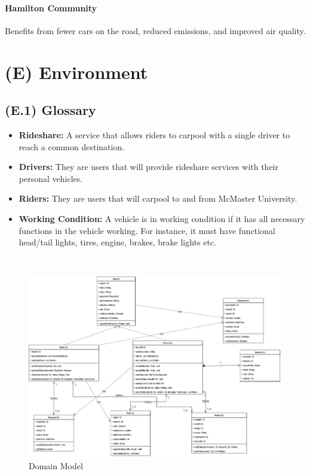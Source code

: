 \documentclass[12pt,letterpaper]{article}
\begin{document}
\paragraph{Hamilton Community}
Benefits from fewer cars on the road, reduced emissions, and improved air quality.

\clearpage

\section{(E) Environment}

\subsection{(E.1) Glossary}
\begin{itemize}
\item \textbf{Rideshare:} A service that allows riders to carpool with a single driver to reach a common destination.
\item \textbf{Drivers:} They are users that will provide rideshare services with their personal vehicles.  
\item \textbf{Riders:} They are users that will carpool to and from McMaster University.
\item \textbf{Working Condition:} A vehicle is in working condition if it has all necessary functions in the vehicle working. For instance, it must have functional head/tail lights, tires, engine, brakes, brake lights etc.
\end{itemize}
\\

\begin{figure}[h] 
    \centering
    \includegraphics[width=0.8\linewidth]{Domain Model.png}
    \caption{Domain Model}
    \label{fig:domain-model}
\end{figure}
\end{document}
